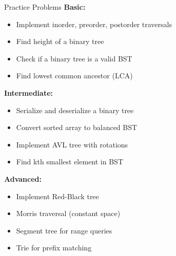 \documentclass[aspectratio=169]{beamer}
\begin{document}
\begin{frame}{Practice Problems}
  \textbf{Basic:}
  \begin{itemize}
    \item Implement inorder, preorder, postorder traversals
    \item Find height of a binary tree
    \item Check if a binary tree is a valid BST
    \item Find lowest common ancestor (LCA)
  \end{itemize}

  \vspace{0.3cm}
  \textbf{Intermediate:}
  \begin{itemize}
    \item Serialize and deserialize a binary tree
    \item Convert sorted array to balanced BST
    \item Implement AVL tree with rotations
    \item Find kth smallest element in BST
  \end{itemize}

  \vspace{0.3cm}
  \textbf{Advanced:}
  \begin{itemize}
    \item Implement Red-Black tree
    \item Morris traversal (constant space)
    \item Segment tree for range queries
    \item Trie for prefix matching
  \end{itemize}
\end{frame}
\end{document}

